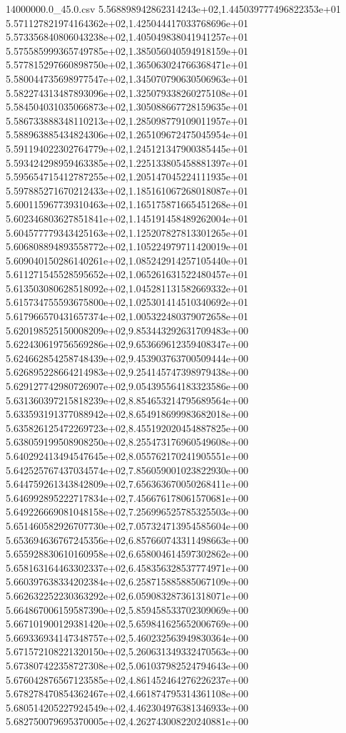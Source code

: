 \begin{filecontents*}{14000000.0_45.0.csv}
5.568898942862314243e+02,1.445039777496822353e+01
5.571127821974164362e+02,1.425044417033768696e+01
5.573356840806043238e+02,1.405049838041941257e+01
5.575585999365749785e+02,1.385056040594918159e+01
5.577815297660898750e+02,1.365063024766368471e+01
5.580044735698977547e+02,1.345070790630506963e+01
5.582274313487893096e+02,1.325079338260275108e+01
5.584504031035066873e+02,1.305088667728159635e+01
5.586733888348110213e+02,1.285098779109011957e+01
5.588963885434824306e+02,1.265109672475045954e+01
5.591194022302764779e+02,1.245121347900385445e+01
5.593424298959463385e+02,1.225133805458881397e+01
5.595654715412787255e+02,1.205147045224111935e+01
5.597885271670212433e+02,1.185161067268018087e+01
5.600115967739310463e+02,1.165175871665451268e+01
5.602346803627851841e+02,1.145191458489262004e+01
5.604577779343425163e+02,1.125207827813301265e+01
5.606808894893558772e+02,1.105224979711420019e+01
5.609040150286140261e+02,1.085242914257105440e+01
5.611271545528595652e+02,1.065261631522480457e+01
5.613503080628518092e+02,1.045281131582669332e+01
5.615734755593675800e+02,1.025301414510340692e+01
5.617966570431657374e+02,1.005322480379072658e+01
5.620198525150008209e+02,9.853443292631709483e+00
5.622430619756569286e+02,9.653669612359408347e+00
5.624662854258748439e+02,9.453903763700509444e+00
5.626895228664214983e+02,9.254145747398979438e+00
5.629127742980726907e+02,9.054395564183323586e+00
5.631360397215818239e+02,8.854653214795689564e+00
5.633593191377088942e+02,8.654918699983682018e+00
5.635826125472269723e+02,8.455192020454887825e+00
5.638059199508908250e+02,8.255473176960549608e+00
5.640292413494547645e+02,8.055762170241905551e+00
5.642525767437034574e+02,7.856059001023822930e+00
5.644759261343842809e+02,7.656363670050268411e+00
5.646992895222717834e+02,7.456676178061570681e+00
5.649226669081048158e+02,7.256996525785325503e+00
5.651460582926707730e+02,7.057324713954585604e+00
5.653694636767245356e+02,6.857660743311498663e+00
5.655928830610160958e+02,6.658004614597302862e+00
5.658163164463302337e+02,6.458356328537774971e+00
5.660397638334202384e+02,6.258715885885067109e+00
5.662632252230363292e+02,6.059083287361318071e+00
5.664867006159587390e+02,5.859458533702309069e+00
5.667101900129381420e+02,5.659841625652006769e+00
5.669336934147348757e+02,5.460232563949830364e+00
5.671572108221320150e+02,5.260631349332470563e+00
5.673807422358727308e+02,5.061037982524794643e+00
5.676042876567123585e+02,4.861452464276226237e+00
5.678278470854362467e+02,4.661874795314361108e+00
5.680514205227924549e+02,4.462304976381346933e+00
5.682750079695370005e+02,4.262743008220240881e+00

\end{filecontents*}
